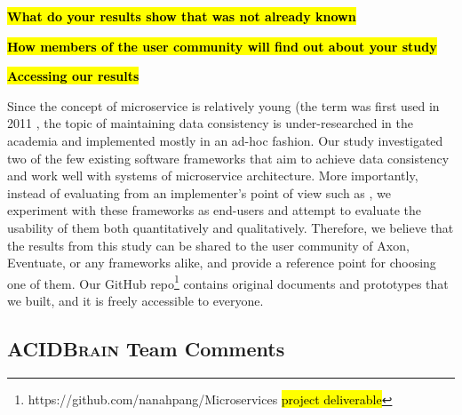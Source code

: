 \hl{\textbf{What do your results show that was not already known}}

\hl{\textbf{How members of the user community will find out about your study}}

\hl{\textbf{Accessing our results}}

Since the concept of microservice is relatively young (the term was first used in 2011 \cite{wiki:micro}, the topic of maintaining data consistency is under-researched in the academia and implemented mostly in an ad-hoc fashion. Our study investigated two of the few existing software frameworks that aim to achieve data consistency and work well with systems of microservice architecture. More importantly, instead of evaluating from an implementer’s point of view such as \cite{comparison, stefanko}, we experiment with these frameworks as end-users and attempt to evaluate the usability of them both quantitatively and qualitatively. Therefore, we believe that the results from this study can be shared to the user community of Axon, Eventuate, or any frameworks alike, and provide a reference point for choosing one of them. Our GitHub repo\footnote{https://github.com/nanahpang/Microservices \hl{project deliverable}} contains original documents and prototypes that we built, and it is freely accessible to everyone.

\subsection{\textsc{ACIDBrain} Team Comments}

